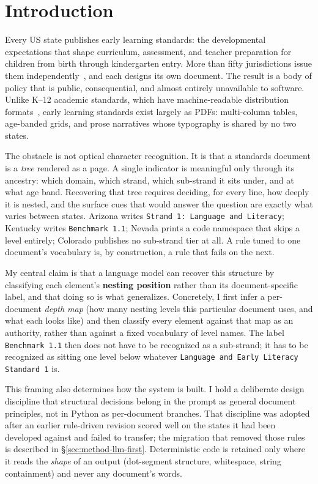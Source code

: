 \section{Introduction}
\label{sec:introduction}

Every US state publishes early learning standards: the developmental
expectations that shape curriculum, assessment, and teacher preparation for
children from birth through kindergarten entry. More than fifty jurisdictions
issue them independently~\citep{ncecqa_elgs,ecs2024governance}, and each designs its
own document. The result is a body of policy that is public, consequential, and
almost entirely unavailable to software. Unlike K--12 academic standards, which
have machine-readable distribution
formats~\citep{sutton2008achievement,1edtech2017case}, early learning standards
exist largely as PDFs: multi-column tables, age-banded grids, and prose narratives
whose typography is shared by no two states.

The obstacle is not optical character recognition. It is that a standards
document is a \emph{tree} rendered as a page. A single indicator is meaningful
only through its ancestry: which domain, which strand, which sub-strand it sits
under, and at what age band. Recovering that tree requires deciding, for every
line, how deeply it is nested, and the surface cues that would answer the
question are exactly what varies between states. Arizona writes
\texttt{Strand 1: Language and Literacy}; Kentucky writes
\texttt{Benchmark 1.1}; Nevada prints a code namespace that skips a level
entirely; Colorado publishes no sub-strand tier at all. A rule tuned to one
document's vocabulary is, by construction, a rule that fails on the next.

My central claim is that a language model can recover this structure by
classifying each element's \textbf{nesting position} rather than its
document-specific label, and that doing so is what generalizes. Concretely, I
first infer a per-document \emph{depth map} (how many nesting levels this
particular document uses, and what each looks like) and then classify every
element against that map as an authority, rather than against a fixed
vocabulary of level names. The label \texttt{Benchmark 1.1} then does not have
to be recognized as a sub-strand; it has to be recognized as sitting one level
below whatever \texttt{Language and Early Literacy Standard 1} is.

This framing also determines how the system is built. I hold a deliberate
design discipline that structural decisions belong in the prompt as general
document principles, not in Python as per-document branches. That discipline
was adopted after an earlier rule-driven revision scored well on the states it
had been developed against and failed to transfer; the migration that removed
those rules is described in \S\ref{sec:method-llm-first}. Deterministic code is
retained only where it reads the \emph{shape} of an output (dot-segment
structure, whitespace, string containment) and never any document's words.

